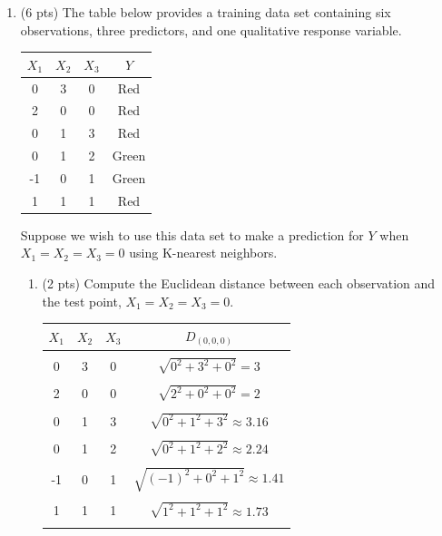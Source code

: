 \documentclass[a4paper]{article}
\theoremstyle{definition}
\newenvironment{soln}{
    \leavevmode\color{blue}\ignorespaces
}{}
\begin{document}
\begin{enumerate}
\begin{enumerate}
\end{enumerate}

\item (6 pts) The table below provides a training data set containing six observations, three predictors, and one qualitative response variable.

\begin{center}
	\begin{tabular}{ c  c  c  c}
		\hline
		$X_{1}$ & $X_{2}$ & $X_{3}$ & $Y$ \\ \hline
		0 & 3 & 0 & Red \\
		2 & 0 & 0 & Red \\
		0 & 1 & 3 & Red \\
		0 & 1 & 2 & Green \\
		-1 & 0 & 1 & Green \\
		1 & 1 & 1 & Red  \\
		\hline
	\end{tabular}
\end{center}

Suppose we wish to use this data set to make a prediction for $Y$ when $X_{1} = X_{2} = X_{3} = 0$ using K-nearest neighbors.

\begin{enumerate}
	\item (2 pts) Compute the Euclidean distance between each observation and the test point, $X_{1} = X_{2} = X_{3}=0$.
 
	\begin{soln}
		\begin{center}
			\begin{tabular}{ c  c  c  c }
				\hline
				$X_{1}$ & $X_{2}$ & $X_{3}$ & $D_{(0, 0, 0)}$ \\ \hline \\
				0 & 3 & 0 & $\sqrt{0^2 + 3^2 + 0^2} = 3$ \\ \\
				2 & 0 & 0 & $\sqrt{2^2 + 0^2 + 0^2} = 2$ \\ \\
				0 & 1 & 3 & $\sqrt{0^2 + 1^2 + 3^2} \approx 3.16$ \\ \\
				0 & 1 & 2 & $\sqrt{0^2 + 1^2 + 2^2} \approx 2.24$ \\ \\
				-1 & 0 & 1 & $\sqrt{(-1)^2 + 0^2 + 1^2} \approx 1.41$ \\ \\
				1 & 1 & 1 & $\sqrt{1^2 + 1^2 + 1^2} \approx 1.73$  \\ \\
				\hline
			\end{tabular}
		\end{center}
	\end{soln}
 

\end{enumerate}
\end{enumerate}
\end{document}
